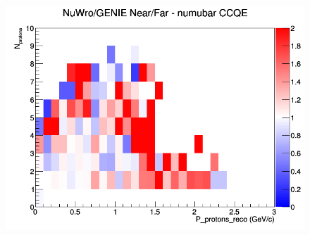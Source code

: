 \begin{figure}[h]
\endminipage
{}
\includegraphics[width=\linewidth]{eff_N_P/LAr/protons/ratios/CCQE_NuWro_GENIE_numubar_NF_N_P.png}
\endminipage
\newline
\end{figure}
\clearpage
